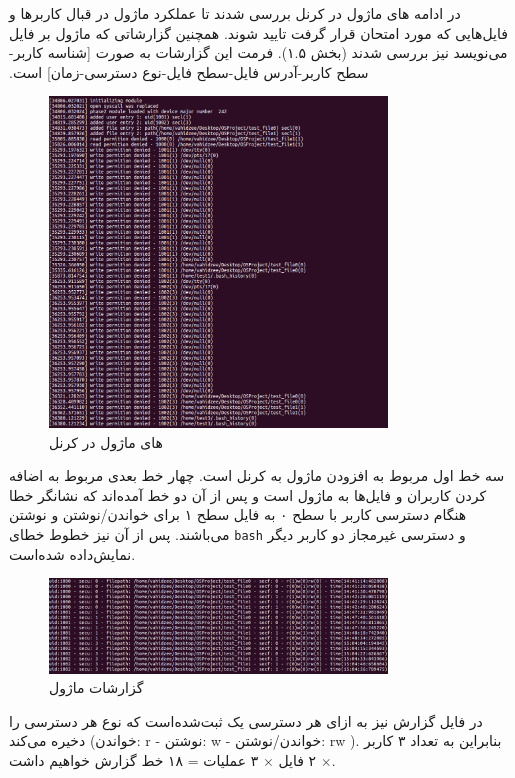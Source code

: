 \documentclass[13pt]{article}
\begin{document}
  	در ادامه های ماژول در کرنل بررسی شدند تا عملکرد ماژول در قبال کاربرها و فایل‌هایی که مورد امتحان قرار گرفت تایید شوند. همچنین گزارشاتی که ماژول بر فایل می‌نویسد نیز بررسی شدند (بخش ۱.۵). فرمت این گزارشات به صورت ‫[شناسه کاربر-سطح کاربر-آدرس فایل-سطح فایل-نوع دسترسی-زمان] است.
  	\begin{figure}[h]
  		\centering
  		\includegraphics[width=0.8\textwidth]{screenshots/user(3)-kernel-log.png}
  		\caption{های ماژول در کرنل}
  	\end{figure}
  
  سه خط اول مربوط به افزودن ماژول به کرنل است. چهار خط بعدی مربوط به اضافه کردن کاربران و فایل‌ها به ماژول است و پس از آن دو خط آمده‌اند که نشانگر خطا هنگام دسترسی کاربر با سطح ۰ به فایل سطح ۱ برای خواندن/نوشتن و نوشتن می‌باشند. پس از آن نیز خطوط خطای \texttt{bash} و دسترسی 	
  	غیرمجاز دو کاربر دیگر نمایش‌داده‌ شده‌است.
      \begin{figure}[h]
      	\centering
      	\includegraphics[width=0.8\textwidth]{screenshots/user(3)-access-log.png}
      	\caption{گزارشات ماژول}
      \end{figure}
  
  	در فایل گزارش نیز به ازای هر دسترسی یک 
  	ثبت‌شده‌است که نوع هر دسترسی را دخیره می‌کند (خواندن: r - نوشتن: w - خواندن/نوشتن: rw ). بنابراین به تعداد ۳ کاربر $\times$
  	۲ فایل 
  	$\times$
  	۳ عملیات = ۱۸ خط گزارش خواهیم داشت.
\end{document}
